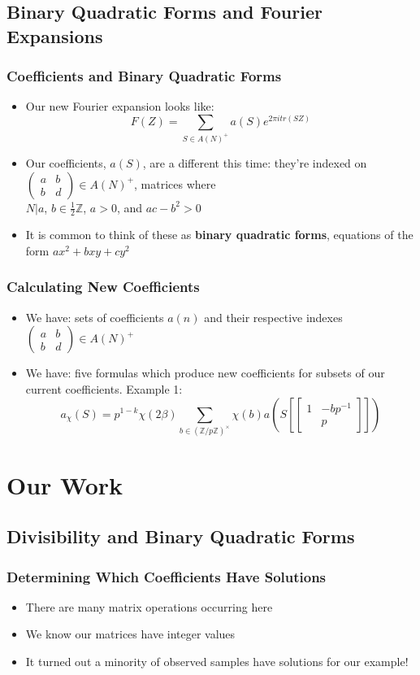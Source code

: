 \documentclass[11pt]{beamer}
\begin{document}
\subsection{Binary Quadratic Forms and Fourier Expansions}
\begin{frame}
\frametitle{Coefficients and Binary Quadratic Forms}
\begin{itemize}
\item Our new Fourier expansion looks like: $$F(Z) = \sum_{S\in A(N)^+}a(S)e^{2\pi itr(SZ)}$$
\item Our coefficients, $a(S)$, are a different this time: they're indexed on $\left( \begin{array}{cc}{a} & {b} \\ {b} & {d}\end{array}\right) \in A(N)^+$, matrices where \\ $N\vert a$, $b\in \frac{1}{2}\mathbb{Z}$, $a > 0$, and $ac-b^2 > 0$
\item It is common to think of these as \textbf{binary quadratic forms}, equations of the form $ax^2+bxy+cy^2$
\end{itemize}
\end{frame}
\begin{frame}
\frametitle{Calculating New Coefficients}
\begin{itemize}
\item We have: sets of coefficients $a(n)$ and their respective indexes $\left( \begin{array}{cc}{a} & {b} \\ {b} & {d}\end{array}\right)\in A(N)^+$
\item We have: five formulas which produce new coefficients for subsets of our current coefficients. Example 1: $$a_{\chi}(S)=p^{1-k} \chi(2 \beta) \sum_{b \in(\mathbb{Z} / p \mathbb{Z})^{ \times}} \chi(b) a\left( S[\left[ \begin{array}{cc}{1} & {-b p^{-1}} \\ {} & {p}\end{array}\right]]\right)$$
\end{itemize}
\end{frame}

\section{Our Work}
\subsection{Divisibility and Binary Quadratic Forms}
\begin{frame}
\frametitle{Determining Which Coefficients Have Solutions}
\begin{itemize}
\item There are many matrix operations occurring here
\item We know our matrices have integer values
\item It turned out a minority of observed samples have solutions for our example!
\end{itemize}
\end{frame}
\end{document}
